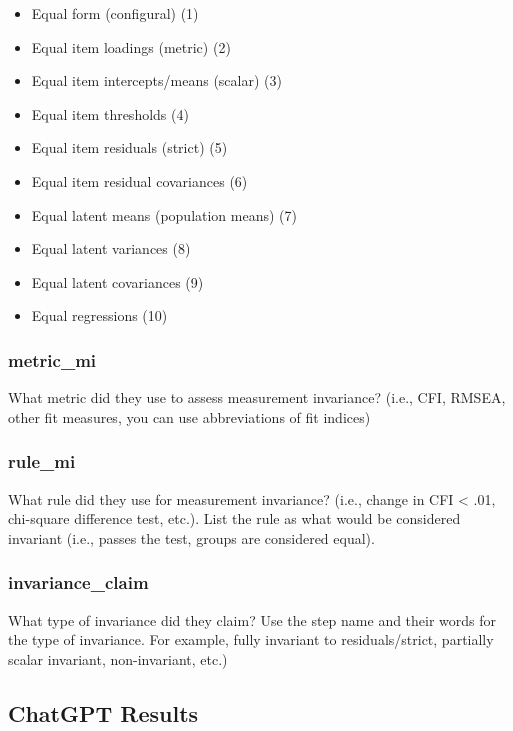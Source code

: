 \documentclass[
  man]{apa7}
\providecommand{\tightlist}{%
  \setlength{\itemsep}{0pt}\setlength{\parskip}{0pt}}
\begin{document}
\begin{itemize}
\tightlist
\item
  Equal form (configural) (1)
\item
  Equal item loadings (metric) (2)
\item
  Equal item intercepts/means (scalar) (3)
\item
  Equal item thresholds (4)
\item
  Equal item residuals (strict) (5)
\item
  Equal item residual covariances (6)
\item
  Equal latent means (population means) (7)
\item
  Equal latent variances (8)
\item
  Equal latent covariances (9)
\item
  Equal regressions (10)
\end{itemize}

\subsubsection{metric\_mi}\label{metric_mi}

What metric did they use to assess measurement invariance? (i.e., CFI, RMSEA, other fit measures, you can use abbreviations of fit indices)

\subsubsection{rule\_mi}\label{rule_mi}

What rule did they use for measurement invariance? (i.e., change in CFI \textless{} .01, chi-square difference test, etc.). List the rule as what would be considered invariant (i.e., passes the test, groups are considered equal).

\subsubsection{invariance\_claim}\label{invariance_claim}

What type of invariance did they claim? Use the step name and their words for the type of invariance. For example, fully invariant to residuals/strict, partially scalar invariant, non-invariant, etc.)

\subsection{ChatGPT Results}\label{chatgpt-results}
\end{document}
